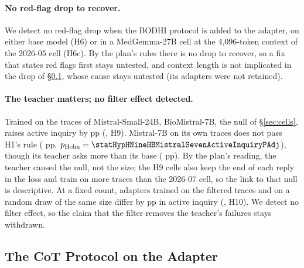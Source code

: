 \documentclass{article}
\newcommand{\bodhi}{BODHI}
\begin{document}
\paragraph{No red-flag drop to recover.} We detect no red-flag drop when the \bodhi{} protocol
is added to the adapter, on either base model (H6) or in a MedGemma-27B cell at the 4,096-token
context of the 2026-05 cell (H6c). By the plan's rules there is no drop to recover, so a fix that
states red flags first stays untested, and context length is not implicated in the drop of
\S\ref{sec:interference}, whose cause stays untested (its adapters were not retained).

\paragraph{The teacher matters; no filter effect detected.} Trained on the traces of
Mistral-Small-24B, BioMistral-7B, the null of \S\ref{sec:cells}, raises active inquiry by
\statHypHNineHBBioMistralTeacherActiveInquiryDiff{} pp (\statHypHNineHBBioMistralTeacherActiveInquiryCI, H9).
Mistral-7B on its own traces does not pass H1's rule (\statHypHNineHBMistralSevenActiveInquiryDiff{} pp,
$p_{\text{Holm}} = \statHypHNineHBMistralSevenActiveInquiryPAdj$), though its teacher asks more than its
base (\statHBMistralSevenActiveInquiryBaseBodhivsBaseDiff{} pp). By the plan's reading, the teacher caused
the null, not the size; the H9 cells also keep the end of each reply in the loss and train on more
traces than the 2026-07 cell, so the link to that null is descriptive. At a fixed count, adapters trained on the filtered traces and on a random
draw of the same size differ by \statHypHTenHBMistralActiveInquiryDiff{} pp in active inquiry
(\statHypHTenHBMistralActiveInquiryCI, H10). We detect no filter effect, so the claim that the filter
removes the teacher's failures stays withdrawn.

\subsection{The CoT Protocol on the Adapter}
\label{sec:interference}
\end{document}

